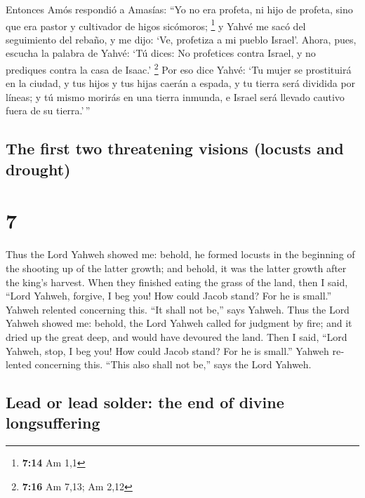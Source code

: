 \begin{paracol}{2}
 Entonces Amós respondió a Amasías: ``Yo no era profeta,
ni hijo de profeta, sino que era pastor y cultivador de higos sicómoros;
\footnote{\textbf{7:14} Am 1,1}  y Yahvé me sacó del
seguimiento del rebaño, y me dijo: `Ve, profetiza a mi pueblo Israel'.
 Ahora, pues, escucha la palabra de Yahvé: `Tú dices: No
profetices contra Israel, y no prediques contra la casa de Isaac.'
\footnote{\textbf{7:16} Am 7,13; Am 2,12}  Por eso dice
Yahvé: `Tu mujer se prostituirá en la ciudad, y tus hijos y tus hijas
caerán a espada, y tu tierra será dividida por líneas; y tú mismo
morirás en una tierra inmunda, e Israel será llevado cautivo fuera de su
tierra.'\,''

\switchcolumn
\begin{otherlanguage}{english}

\hypertarget{the-first-two-threatening-visions-locusts-and-drought}{%
\subsection{The first two threatening visions (locusts and
drought)}\label{the-first-two-threatening-visions-locusts-and-drought}}

\hypertarget{section-13}{%
\section{7}\label{section-13}}

 Thus the Lord Yahweh showed me: behold, he formed locusts
in the beginning of the shooting up of the latter growth; and behold, it
was the latter growth after the king's harvest.  When they
finished eating the grass of the land, then I said, ``Lord Yahweh,
forgive, I beg you! How could Jacob stand? For he is small.''
 Yahweh relented concerning this. ``It shall not be,''
says Yahweh.  Thus the Lord Yahweh showed me: behold, the
Lord Yahweh called for judgment by fire; and it dried up the great deep,
and would have devoured the land.  Then I said, ``Lord
Yahweh, stop, I beg you! How could Jacob stand? For he is small.''
 Yahweh relented concerning this. ``This also shall not
be,'' says the Lord Yahweh.

\hypertarget{lead-or-lead-solder-the-end-of-divine-longsuffering}{%
\subsection{Lead or lead solder: the end of divine
longsuffering}\label{lead-or-lead-solder-the-end-of-divine-longsuffering}}


\end{otherlanguage}
\end{paracol}
